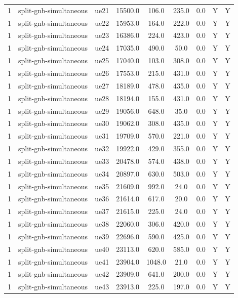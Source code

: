 \begin{table}[ht]
\begin{tabular}{|c|c|c|c|c|c|c|c|c|}
1 & split-gnb-simultaneous & ue21 & 15500.0 & 106.0 & 235.0 & 0.0 & Y & Y \\
1 & split-gnb-simultaneous & ue22 & 15953.0 & 164.0 & 222.0 & 0.0 & Y & Y \\
1 & split-gnb-simultaneous & ue23 & 16386.0 & 224.0 & 423.0 & 0.0 & Y & Y \\
1 & split-gnb-simultaneous & ue24 & 17035.0 & 490.0 & 50.0 & 0.0 & Y & Y \\
1 & split-gnb-simultaneous & ue25 & 17040.0 & 103.0 & 308.0 & 0.0 & Y & Y \\
1 & split-gnb-simultaneous & ue26 & 17553.0 & 215.0 & 431.0 & 0.0 & Y & Y \\
1 & split-gnb-simultaneous & ue27 & 18189.0 & 478.0 & 435.0 & 0.0 & Y & Y \\
1 & split-gnb-simultaneous & ue28 & 18194.0 & 155.0 & 431.0 & 0.0 & Y & Y \\
1 & split-gnb-simultaneous & ue29 & 19056.0 & 648.0 & 35.0 & 0.0 & Y & Y \\
1 & split-gnb-simultaneous & ue30 & 19062.0 & 308.0 & 435.0 & 0.0 & Y & Y \\
1 & split-gnb-simultaneous & ue31 & 19709.0 & 570.0 & 221.0 & 0.0 & Y & Y \\
1 & split-gnb-simultaneous & ue32 & 19922.0 & 429.0 & 355.0 & 0.0 & Y & Y \\
1 & split-gnb-simultaneous & ue33 & 20478.0 & 574.0 & 438.0 & 0.0 & Y & Y \\
1 & split-gnb-simultaneous & ue34 & 20897.0 & 630.0 & 503.0 & 0.0 & Y & Y \\
1 & split-gnb-simultaneous & ue35 & 21609.0 & 992.0 & 24.0 & 0.0 & Y & Y \\
1 & split-gnb-simultaneous & ue36 & 21614.0 & 617.0 & 20.0 & 0.0 & Y & Y \\
1 & split-gnb-simultaneous & ue37 & 21615.0 & 225.0 & 24.0 & 0.0 & Y & Y \\
1 & split-gnb-simultaneous & ue38 & 22060.0 & 306.0 & 420.0 & 0.0 & Y & Y \\
1 & split-gnb-simultaneous & ue39 & 22696.0 & 590.0 & 425.0 & 0.0 & Y & Y \\
1 & split-gnb-simultaneous & ue40 & 23113.0 & 620.0 & 585.0 & 0.0 & Y & Y \\
1 & split-gnb-simultaneous & ue41 & 23904.0 & 1048.0 & 21.0 & 0.0 & Y & Y \\
1 & split-gnb-simultaneous & ue42 & 23909.0 & 641.0 & 200.0 & 0.0 & Y & Y \\
1 & split-gnb-simultaneous & ue43 & 23913.0 & 225.0 & 197.0 & 0.0 & Y & Y \\

\end{tabular}
\end{table}

